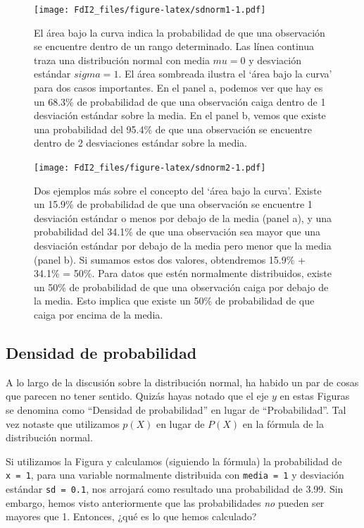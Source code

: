 \documentclass[spanish,]{book}
\begin{document}
\begin{figure}
\centering
\texttt{[image: FdI2\_files/figure-latex/sdnorm1-1.pdf]}
\caption{\label{fig:sdnorm1}El área bajo la curva indica la probabilidad de
que una observación se encuentre dentro de un rango determinado. Las
línea continua traza una distribución normal con media \(mu=0\) y
desviación estándar \(sigma=1\). El área sombreada ilustra el `área bajo
la curva' para dos casos importantes. En el panel a, podemos ver que hay
es un 68.3\% de probabilidad de que una observación caiga dentro de 1
desviación estándar sobre la media. En el panel b, vemos que existe una
probabilidad del 95.4\% de que una observación se encuentre dentro de 2
desviaciones estándar sobre la media.}
\end{figure}

\begin{figure}
\centering
\texttt{[image: FdI2\_files/figure-latex/sdnorm2-1.pdf]}
\caption{\label{fig:sdnorm2}Dos ejemplos más sobre el concepto del `área
bajo la curva'. Existe un 15.9\% de probabilidad de que una observación
se encuentre 1 desviación estándar o menos por debajo de la media (panel
a), y una probabilidad del 34.1\% de que una observación sea mayor que
una desviación estándar por debajo de la media pero menor que la media
(panel b). Si sumamos estos dos valores, obtendremos 15.9\% + 34.1\% =
50\%. Para datos que estén normalmente distribuidos, existe un 50\% de
probabilidad de que una observación caiga por debajo de la media. Esto
implica que existe un 50\% de probabilidad de que caiga por encima de la
media.}
\end{figure}

\subsection{Densidad de probabilidad}\label{density}

A lo largo de la discusión sobre la distribución normal, ha habido un
par de cosas que parecen no tener sentido. Quizás hayas notado que el
eje \(y\) en estas Figuras se denomina como ``Densidad de probabilidad''
en lugar de ``Probabilidad''. Tal vez notaste que utilizamos \(p(X)\) en
lugar de \(P(X)\) en la fórmula de la distribución normal.

Si utilizamos la Figura y calculamos (siguiendo la fórmula) la
probabilidad de \texttt{x\ =\ 1}, para una variable normalmente
distribuida con \texttt{media\ =\ 1} y desviación estándar
\texttt{sd\ =\ 0.1}, nos arrojará como resultado una probabilidad de
3.99. Sin embargo, hemos visto anteriormente que las probabilidades
\emph{no} pueden ser mayores que 1. Entonces, ¿qué es lo que hemos
calculado?
\end{document}
